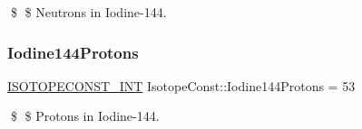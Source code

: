 \$ \$ Neutrons in Iodine-\/144. \mbox{\label{group___isotope_const-_iodine-_i144_ga37a419213348c56ba062dc7bc27163cb}} 
\subsubsection{\texorpdfstring{Iodine144\+Protons}{Iodine144Protons}}
{\footnotesize\ttfamily \mbox{\hyperlink{group___isotope_const-_macros_ga5f18360b3e99483a35c32d789e62621c}{I\+S\+O\+T\+O\+P\+E\+C\+O\+N\+S\+T\+\_\+\+I\+NT}} Isotope\+Const\+::\+Iodine144\+Protons = 53}

\$ \$ Protons in Iodine-\/144. 